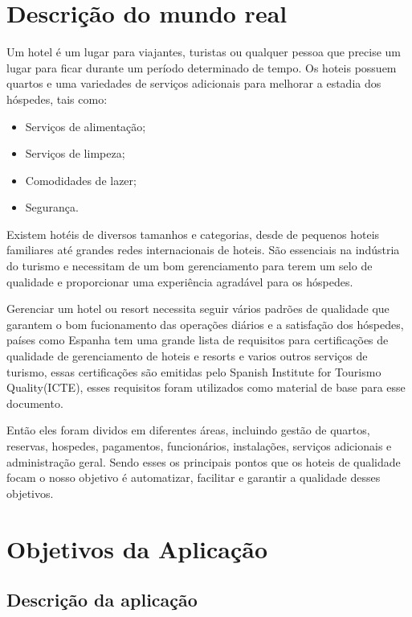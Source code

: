 \section{Descrição do mundo real}

Um hotel é um lugar para viajantes, turistas ou qualquer pessoa que precise um lugar para ficar durante um período determinado de tempo. Os hoteis possuem quartos e uma variedades de serviços adicionais para melhorar a estadia dos hóspedes, tais como:

\begin{itemize}
    \item Serviços de alimentação;
    \item Serviços de limpeza;
    \item Comodidades de lazer;
    \item Segurança.
\end{itemize}

Existem hotéis de diversos tamanhos e categorias, desde de pequenos hoteis familiares até grandes redes internacionais de hoteis. São essenciais na indústria do turismo e necessitam de um bom gerenciamento para terem um selo de qualidade e proporcionar uma experiência agradável para os hóspedes.

Gerenciar um hotel ou resort necessita seguir vários padrões de qualidade que garantem o bom fucionamento das operações diários e a satisfação dos hóspedes, países como Espanha tem uma grande lista de requisitos para certificações de qualidade de gerenciamento de hoteis e resorts e varios outros serviços de turismo, essas certificações são emitidas pelo Spanish Institute for Tourismo Quality(ICTE), esses requisitos foram utilizados como material de base para esse documento.

Então eles foram dividos em diferentes áreas, incluindo gestão de quartos, reservas, hospedes, pagamentos, funcionários, instalações, serviços adicionais e administração geral. Sendo esses os principais pontos que os hoteis de qualidade focam o nosso objetivo é automatizar, facilitar e garantir a qualidade desses objetivos.

\newpage

\section{Objetivos da Aplicação}

\subsection{Descrição da aplicação}

